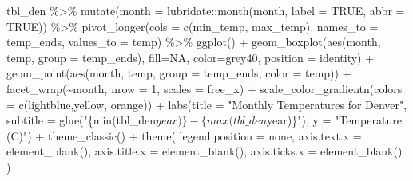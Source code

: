 \documentclass[
]{book}
\newenvironment{Shaded}{\begin{snugshade}}{\end{snugshade}}
\newcommand{\AttributeTok}[1]{\textcolor[rgb]{0.77,0.63,0.00}{#1}}
\newcommand{\ConstantTok}[1]{\textcolor[rgb]{0.00,0.00,0.00}{#1}}
\newcommand{\DecValTok}[1]{\textcolor[rgb]{0.00,0.00,0.81}{#1}}
\newcommand{\FunctionTok}[1]{\textcolor[rgb]{0.00,0.00,0.00}{#1}}
\newcommand{\NormalTok}[1]{#1}
\newcommand{\SpecialCharTok}[1]{\textcolor[rgb]{0.00,0.00,0.00}{#1}}
\newcommand{\StringTok}[1]{\textcolor[rgb]{0.31,0.60,0.02}{#1}}
\begin{document}
\begin{Shaded}
\begin{Highlighting}[]
\NormalTok{tbl\_den }\SpecialCharTok{\%\textgreater{}\%}
  \FunctionTok{mutate}\NormalTok{(}\AttributeTok{month =}\NormalTok{ lubridate}\SpecialCharTok{::}\FunctionTok{month}\NormalTok{(month, }\AttributeTok{label =} \ConstantTok{TRUE}\NormalTok{, }\AttributeTok{abbr =} \ConstantTok{TRUE}\NormalTok{)) }\SpecialCharTok{\%\textgreater{}\%}
  \FunctionTok{pivot\_longer}\NormalTok{(}\AttributeTok{cols =} \FunctionTok{c}\NormalTok{(}\StringTok{\textquotesingle{}min\_temp\textquotesingle{}}\NormalTok{, }\StringTok{\textquotesingle{}max\_temp\textquotesingle{}}\NormalTok{), }\AttributeTok{names\_to =} \StringTok{\textquotesingle{}temp\_ends\textquotesingle{}}\NormalTok{, }\AttributeTok{values\_to =} \StringTok{\textquotesingle{}temp\textquotesingle{}}\NormalTok{) }\SpecialCharTok{\%\textgreater{}\%}
  \FunctionTok{ggplot}\NormalTok{() }\SpecialCharTok{+}
  \FunctionTok{geom\_boxplot}\NormalTok{(}\FunctionTok{aes}\NormalTok{(month, temp, }\AttributeTok{group =}\NormalTok{ temp\_ends), }\AttributeTok{fill=}\ConstantTok{NA}\NormalTok{, }\AttributeTok{color=}\StringTok{\textquotesingle{}grey40\textquotesingle{}}\NormalTok{, }\AttributeTok{position =} \StringTok{\textquotesingle{}identity\textquotesingle{}}\NormalTok{) }\SpecialCharTok{+}
  \FunctionTok{geom\_point}\NormalTok{(}\FunctionTok{aes}\NormalTok{(month, temp, }\AttributeTok{group =}\NormalTok{ temp\_ends, }\AttributeTok{color =}\NormalTok{ temp)) }\SpecialCharTok{+}
  \FunctionTok{facet\_wrap}\NormalTok{(}\SpecialCharTok{\textasciitilde{}}\NormalTok{month, }\AttributeTok{nrow =} \DecValTok{1}\NormalTok{, }\AttributeTok{scales =} \StringTok{\textquotesingle{}free\_x\textquotesingle{}}\NormalTok{) }\SpecialCharTok{+}
  \FunctionTok{scale\_color\_gradientn}\NormalTok{(}\AttributeTok{colors =} \FunctionTok{c}\NormalTok{(}\StringTok{\textquotesingle{}lightblue\textquotesingle{}}\NormalTok{,}\StringTok{\textquotesingle{}yellow\textquotesingle{}}\NormalTok{, }\StringTok{\textquotesingle{}orange\textquotesingle{}}\NormalTok{)) }\SpecialCharTok{+}
  \FunctionTok{labs}\NormalTok{(}\AttributeTok{title =} \StringTok{"Monthly Temperatures for Denver"}\NormalTok{,}
       \AttributeTok{subtitle =} \FunctionTok{glue}\NormalTok{(}\StringTok{"\{min(tbl\_den$year)\} {-} \{max(tbl\_den$year)\}"}\NormalTok{),}
       \AttributeTok{y =} \StringTok{"Temperature (C)"}\NormalTok{) }\SpecialCharTok{+}
  \FunctionTok{theme\_classic}\NormalTok{() }\SpecialCharTok{+}
  \FunctionTok{theme}\NormalTok{(}
    \AttributeTok{legend.position =} \StringTok{\textquotesingle{}none\textquotesingle{}}\NormalTok{,}
    \AttributeTok{axis.text.x =} \FunctionTok{element\_blank}\NormalTok{(),}
    \AttributeTok{axis.title.x =} \FunctionTok{element\_blank}\NormalTok{(),}
    \AttributeTok{axis.ticks.x =} \FunctionTok{element\_blank}\NormalTok{()}
\NormalTok{  )}
\end{Highlighting}
\end{Shaded}
\end{document}
